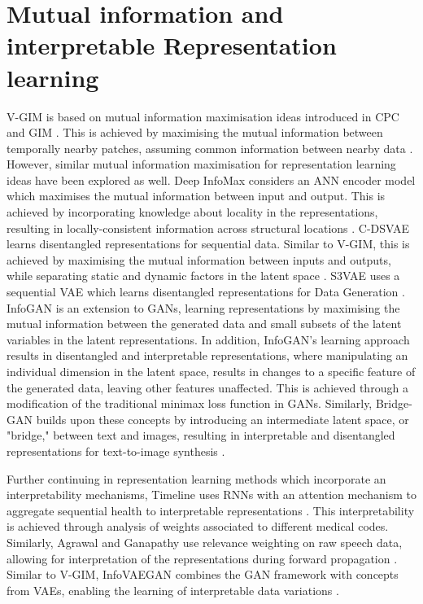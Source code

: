 \section{Mutual information and interpretable Representation learning}
	V-GIM is based on mutual information maximisation ideas introduced in CPC and GIM \cite{lowePuttingEndEndtoEnd2020, oordRepresentationLearningContrastive2019}. This is achieved by maximising the mutual information between temporally nearby patches, assuming common information between nearby data \cite{lowePuttingEndEndtoEnd2020}. However, similar mutual information maximisation for representation learning ideas have been explored as well. Deep InfoMax considers an ANN encoder model which maximises the mutual information between input and output. This is achieved by incorporating knowledge about locality in the representations, resulting in locally-consistent information across structural locations \cite{hjelmLearningDeepRepresentations2019}.
	C-DSVAE learns disentangled representations for sequential data. Similar to V-GIM, this is achieved by maximising the mutual information between inputs and outputs, while separating static and dynamic factors in the latent space \cite{baiContrastivelyDisentangledSequential2021}. S3VAE uses a sequential VAE which learns disentangled representations for Data Generation \cite{zhuS3VAESelfSupervisedSequential2020}.
	InfoGAN \cite{chenInfoGANInterpretableRepresentation2016} is an extension to GANs, learning representations by maximising the mutual information between the generated data and small subsets of the latent variables in the latent representations. In addition, InfoGAN's learning approach results in disentangled and interpretable representations, where manipulating an individual dimension in the latent space, results in changes to a specific feature of the generated data, leaving other features unaffected. This is achieved through a modification of the traditional minimax loss function in GANs. Similarly, Bridge-GAN builds upon these concepts by introducing an intermediate latent space, or "bridge," between text and images, resulting in interpretable and disentangled representations for text-to-image synthesis \cite{yuanBridgeGANInterpretableRepresentation2020}.
	
	Further continuing in representation learning methods which incorporate an interpretability mechanisms, Timeline uses RNNs with an attention mechanism to aggregate sequential health to interpretable representations \cite{baiInterpretableRepresentationLearning2018}. This interpretability is achieved through analysis of weights associated to different medical codes. Similarly, Agrawal and Ganapathy use relevance weighting on raw speech data, allowing for interpretation of the representations during forward propagation \cite{agrawalInterpretableRepresentationLearning2020}. Similar to V-GIM, InfoVAEGAN combines the GAN framework with concepts from VAEs, enabling the learning of interpretable data variations \cite{yeInfoVAEGANLearningJoint2021}.
	
